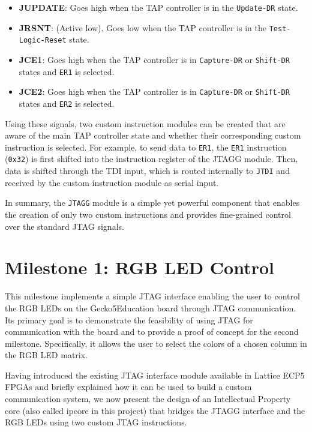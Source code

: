 \documentclass[a4paper,11pt,oneside]{report}
\newcommand{\boardName}{Gecko5Education \xspace}
\begin{document}
\begin{itemize}
\begin{itemize}
        \item \textbf{JUPDATE}: Goes high when the TAP controller is in the \texttt{Update-DR} state.
        
        \item \textbf{JRSNT}: (Active low). Goes low when the TAP controller is in the 
        \texttt{Test-Logic-Reset} state.
        
        \item \textbf{JCE1}: Goes high when the TAP controller is in \texttt{Capture-DR} or 
        \texttt{Shift-DR} states and \texttt{ER1} is selected.

        \item \textbf{JCE2}: Goes high when the TAP controller is in \texttt{Capture-DR} or 
        \texttt{Shift-DR} states and \texttt{ER2} is selected.
    \end{itemize}
\end{itemize}

Using these signals, two custom instruction modules can be created that are aware of the main TAP controller state
and whether their corresponding custom instruction is selected.
For example, to send data to \texttt{ER1}, the \texttt{ER1} instruction (\texttt{0x32}) is first shifted into the instruction register of the JTAGG module.
Then, data is shifted through the TDI input, which is routed internally to \texttt{JTDI} and received by the custom instruction module as serial input.

In summary, the \texttt{JTAGG} module is a simple yet powerful component that enables the creation of only two custom instructions
and provides fine-grained control over the standard JTAG signals.

\section{Milestone 1: RGB LED Control}

This milestone implements a simple JTAG interface enabling the user to control the RGB LEDs on the \boardName board through JTAG communication.  
Its primary goal is to demonstrate the feasibility of using JTAG for communication with the board and to provide a proof of concept for the second milestone.  
Specifically, it allows the user to select the colors of a chosen column in the RGB LED matrix.  

Having introduced the existing JTAG interface module available in Lattice ECP5 FPGAs and briefly explained how it can be used to build a custom communication system,  
we now present the design of an Intellectual Property core (also called ipcore in this project) that bridges the JTAGG interface and the RGB LEDs using two custom JTAG instructions.
\end{document}
